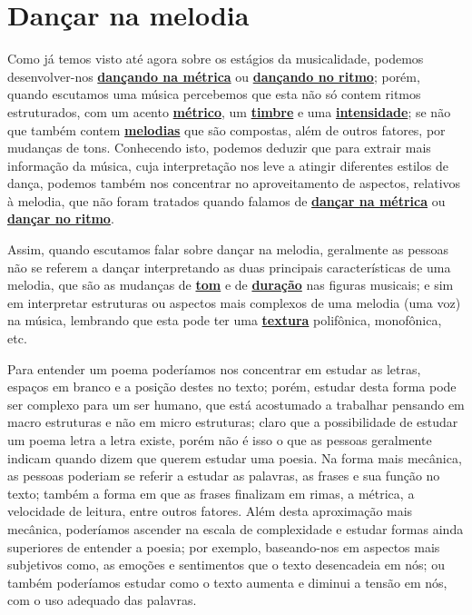 

\newpage
\section{Dançar na melodia}
\label{subsec:dancamelodia}

Como já temos visto até agora sobre os estágios da musicalidade, 
 podemos desenvolver-nos  \hyperref[subsec:dancametrica]{\textbf{dançando na métrica}}  
ou \hyperref[subsec:dancaritmo]{\textbf{dançando no ritmo}};
porém, quando escutamos uma música percebemos que esta não só contem ritmos estruturados, 
com um acento \hyperref[def:Metrica]{\textbf{métrico}}, um \hyperref[sec:pos:timbre]{\textbf{timbre}} 
e uma \hyperref[sec:pos:Intensidade]{\textbf{intensidade}};
se não que também contem \hyperref[sec:pos:Melodia]{\textbf{melodias}} que são compostas, além de outros fatores, 
por mudanças de tons.
Conhecendo isto, 
podemos deduzir que para extrair mais informação da música,
cuja interpretação nos leve a atingir diferentes estilos de dança,
podemos também nos concentrar no aproveitamento de aspectos, relativos à melodia, que não foram tratados 
quando falamos de \hyperref[subsec:dancametrica]{\textbf{dançar na métrica}} ou 
\hyperref[subsec:dancaritmo]{\textbf{dançar no ritmo}}.


Assim, quando escutamos falar sobre dançar na melodia,
geralmente as pessoas não se referem a dançar interpretando as duas principais características de uma melodia,
que são as mudanças de \hyperref[sec:pos:Altura]{\textbf{tom}} e de
\hyperref[sec:pos:Duracion]{\textbf{duração}} nas figuras musicais;
e sim em interpretar estruturas ou aspectos mais complexos de uma melodia (uma voz) na música,
lembrando que esta pode ter uma \hyperref[sec:texturasmusica]{\textbf{textura}} polifônica, monofônica, etc. 


\begin{example}
Para entender um poema poderíamos nos concentrar em estudar as letras, 
espaços em branco  e a posição destes no texto;
porém, estudar desta forma pode ser complexo para um ser humano,
que está acostumado a trabalhar pensando em macro estruturas e não em micro estruturas;
claro que a possibilidade de estudar um poema letra a letra existe,
porém não é isso o que as pessoas geralmente indicam quando dizem que querem estudar uma poesia.
Na forma mais mecânica, 
as pessoas poderiam se referir a estudar as palavras, as frases e sua função no texto;
também a forma em que as frases finalizam em rimas, a métrica,
a velocidade de leitura, entre outros fatores.
Além desta aproximação mais mecânica, 
poderíamos ascender na escala de complexidade e estudar formas ainda superiores de entender a poesia;
por exemplo, baseando-nos em aspectos mais subjetivos como, 
as emoções e sentimentos  que o texto desencadeia em nós;
ou também poderíamos estudar como o texto aumenta e diminui a tensão em nós,
 com o uso adequado das palavras.
\end{example}

